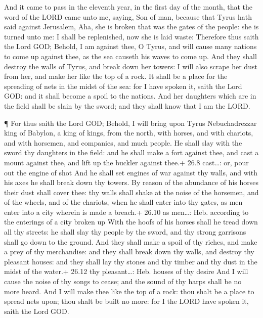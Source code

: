  And it came to pass in the eleventh year, in the first day
of the month, that the word of the LORD came unto me, saying,
 Son of man, because that Tyrus hath said against Jerusalem,
Aha, she is broken that was the gates of the people: she is turned unto
me: I shall be replenished, now she is laid waste: 
Therefore thus saith the Lord GOD; Behold, I am against thee, O Tyrus,
and will cause many nations to come up against thee, as the sea causeth
his waves to come up.  And they shall destroy the walls of
Tyrus, and break down her towers: I will also scrape her dust from her,
and make her like the top of a rock.  It shall be a place
for the spreading of nets in the midst of the sea: for I have spoken it,
saith the Lord GOD: and it shall become a spoil to the nations.
 And her daughters which are in the field shall be slain by
the sword; and they shall know that I am the LORD.

 ¶ For thus saith the Lord GOD; Behold, I will bring upon
Tyrus Nebuchadrezzar king of Babylon, a king of kings, from the north,
with horses, and with chariots, and with horsemen, and companies, and
much people.  He shall slay with the sword thy daughters in
the field: and he shall make a fort against thee, and cast a mount
against thee, and lift up the buckler against thee.+ 26.8 cast\ldots:
or, pour out the engine of shot  And he shall set engines of
war against thy walls, and with his axes he shall break down thy towers.
 By reason of the abundance of his horses their dust shall
cover thee: thy walls shall shake at the noise of the horsemen, and of
the wheels, and of the chariots, when he shall enter into thy gates, as
men enter into a city wherein is made a breach.+ 26.10 as men\ldots:
Heb. according to the enterings of a city broken up  With
the hoofs of his horses shall he tread down all thy streets: he shall
slay thy people by the sword, and thy strong garrisons shall go down to
the ground.  And they shall make a spoil of thy riches, and
make a prey of thy merchandise: and they shall break down thy walls, and
destroy thy pleasant houses: and they shall lay thy stones and thy
timber and thy dust in the midst of the water.+ 26.12 thy
pleasant\ldots: Heb. houses of thy desire  And I will cause
the noise of thy songs to cease; and the sound of thy harps shall be no
more heard.  And I will make thee like the top of a rock:
thou shalt be a place to spread nets upon; thou shalt be built no more:
for I the LORD have spoken it, saith the Lord GOD.

